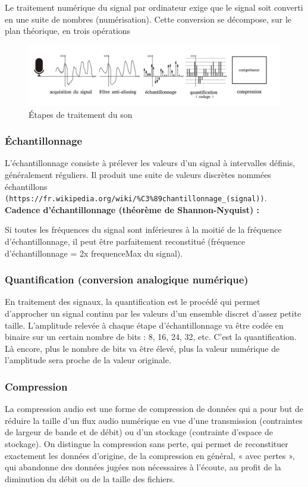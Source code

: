 \documentclass[a4paper, 12pt]{book}
\begin{document}
Le traitement numérique du signal par ordinateur exige que le signal soit converti en une suite de nombres (numérisation). Cette conversion se décompose, sur le plan théorique, en trois opérations

\begin{figure}[htbp]
  \centering
  \includegraphics[width=1.2\linewidth]{fig/etape-acquisition-son.png}
  \caption{Étapes de traitement du son}
\end{figure}

\subsubsection{Échantillonnage}

L'échantillonnage consiste à prélever les valeurs d'un signal à intervalles définis, généralement réguliers. Il produit une suite de valeurs discrètes nommées échantillons \texttt{(https://fr.wikipedia.org/wiki/\%C3\%89chantillonnage\_(signal))}.\\

\textbf{Cadence d'échantillonnage (théorème de Shannon-Nyquist) :}

Si toutes les fréquences du signal sont inférieures à la moitié de la fréquence d'échantillonnage, il peut être parfaitement reconstitué (fréquence d’échantillonnage = 2x frequenceMax du signal).

\subsubsection{Quantification (conversion analogique numérique)}
En traitement des signaux, la quantification est le procédé qui permet d'approcher un signal continu par les valeurs d'un ensemble discret d'assez petite taille. L’amplitude relevée à chaque étape d’échantillonnage va être codée en binaire sur un certain nombre de bits : 8, 16, 24, 32, etc. C’est la quantification. Là encore, plus le nombre de bits va être élevé, plus la valeur numérique de l’amplitude sera proche de la valeur originale.

\subsubsection{Compression}
La compression audio est une forme de compression de données qui a pour but de réduire la taille d'un flux audio numérique en vue d'une transmission (contraintes de largeur de bande et de débit) ou d'un stockage (contrainte d'espace de stockage). On distingue la compression sans perte, qui permet de reconstituer exactement les données d'origine, de la compression en général, « avec pertes », qui abandonne des données jugées non nécessaires à l'écoute, au profit de la diminution du débit ou de la taille des fichiers. 
\end{document}
